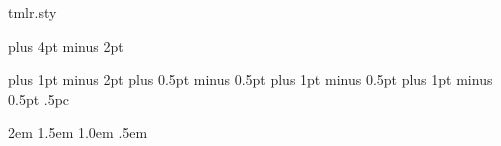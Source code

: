 \begin{filecontents*}[overwrite]{tmlr.sty}
\renewenvironment{abstract}{\vskip.075in\centerline{\large\bf\sffamily
Abstract}\vspace{0.5ex}\begin{quote}}{\par\end{quote}\vskip 1ex}

\def\section{\@startsection {section}{1}{\z@}{-2.0ex plus
    -0.5ex minus -.2ex}{1.5ex plus 0.3ex
minus0.2ex}{\large\bf\raggedright\sffamily}}

\def\subsection{\@startsection{subsection}{2}{\z@}{-1.8ex plus
-0.5ex minus -.2ex}{0.8ex plus .2ex}{\normalsize\bf\raggedright\sffamily}}
\def\subsubsection{\@startsection{subsubsection}{3}{\z@}{-1.5ex
plus      -0.5ex minus -.2ex}{0.5ex plus
.2ex}{\normalsize\bf\raggedright\sffamily}}
\def\paragraph{\@startsection{paragraph}{4}{\z@}{1.5ex plus
0.5ex minus .2ex}{-1em}{\normalsize\bf}}
\def\subparagraph{\@startsection{subparagraph}{5}{\z@}{1.5ex plus
  0.5ex minus .2ex}{-1em}{\normalsize\bf}}
\def\subsubsubsection{\vskip
5pt{\noindent\normalsize\rm\raggedright\sffamily}}


\footnotesep 6.65pt %
\skip\footins 9pt plus 4pt minus 2pt
\def\footnoterule{\kern-3pt \hrule width 12pc \kern 2.6pt }
\setcounter{footnote}{0}

\parindent 0pt
\topsep 4pt plus 1pt minus 2pt
\partopsep 1pt plus 0.5pt minus 0.5pt
\itemsep 2pt plus 1pt minus 0.5pt
\parsep 2pt plus 1pt minus 0.5pt
\parskip .5pc


\leftmargini\leftmargin \leftmarginii 2em
\leftmarginiii 1.5em \leftmarginiv 1.0em \leftmarginv .5em


\def\@listi{\leftmargin\leftmargini}
\def\@listii{\leftmargin\leftmarginii
   \labelwidth\leftmarginii\advance\labelwidth-\labelsep
   \topsep 2pt plus 1pt minus 0.5pt
   \parsep 1pt plus 0.5pt minus 0.5pt
   \itemsep \parsep}
\def\@listiii{\leftmargin\leftmarginiii
    \labelwidth\leftmarginiii\advance\labelwidth-\labelsep
    \topsep 1pt plus 0.5pt minus 0.5pt
    \parsep \z@ \partopsep 0.5pt plus 0pt minus 0.5pt
    \itemsep \topsep}
\def\@listiv{\leftmargin\leftmarginiv
     \labelwidth\leftmarginiv\advance\labelwidth-\labelsep}
\def\@listv{\leftmargin\leftmarginv
     \labelwidth\leftmarginv\advance\labelwidth-\labelsep}
\def\@listvi{\leftmargin\leftmarginvi
     \labelwidth\leftmarginvi\advance\labelwidth-\labelsep}


\end{filecontents*}
